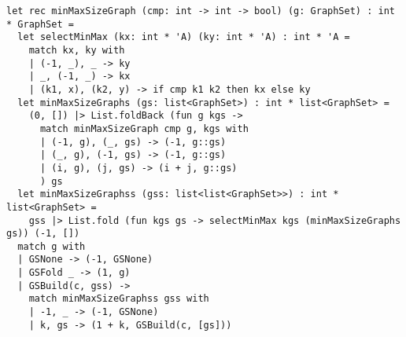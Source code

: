 \documentclass[submission,copyright,creativecommons]{eptcs}
\begin{document}
\begin{lstlisting}[caption={Selecting a Graph of Minimum/Maximum Size from a Graph Set}]
let rec minMaxSizeGraph (cmp: int -> int -> bool) (g: GraphSet) : int * GraphSet =
  let selectMinMax (kx: int * 'A) (ky: int * 'A) : int * 'A =
    match kx, ky with
    | (-1, _), _ -> ky
    | _, (-1, _) -> kx
    | (k1, x), (k2, y) -> if cmp k1 k2 then kx else ky
  let minMaxSizeGraphs (gs: list<GraphSet>) : int * list<GraphSet> =
    (0, []) |> List.foldBack (fun g kgs -> 
      match minMaxSizeGraph cmp g, kgs with
      | (-1, g), (_, gs) -> (-1, g::gs)
      | (_, g), (-1, gs) -> (-1, g::gs)
      | (i, g), (j, gs) -> (i + j, g::gs)
      ) gs
  let minMaxSizeGraphss (gss: list<list<GraphSet>>) : int * list<GraphSet> =
    gss |> List.fold (fun kgs gs -> selectMinMax kgs (minMaxSizeGraphs gs)) (-1, [])
  match g with
  | GSNone -> (-1, GSNone)
  | GSFold _ -> (1, g)
  | GSBuild(c, gss) -> 
    match minMaxSizeGraphss gss with
    | -1, _ -> (-1, GSNone)
    | k, gs -> (1 + k, GSBuild(c, [gs]))
\end{lstlisting}
\end{document}
